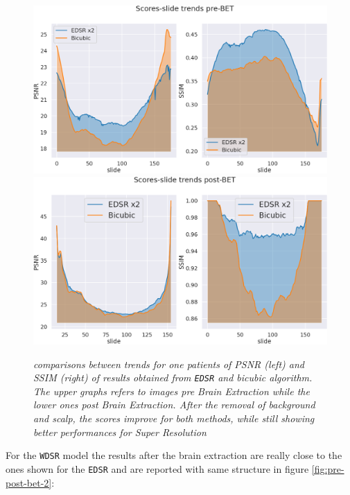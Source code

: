 \documentclass[12pt,a4paper]{report}
\begin{document}
\begin{figure}[H]
  \centering
  \includegraphics[scale=0.27]{./images/pre_bet_edsr.png}
  \includegraphics[scale=0.27]{./images/betted_x2_slide.png}
 \caption{\it comparisons between trends for one patients of PSNR (left) and SSIM (right) of results obtained from {\tt EDSR} and bicubic algorithm. The upper graphs refers to images pre Brain Extraction while the lower ones post Brain Extraction. After the removal of background and scalp, the scores improve for both methods, while still showing better performances for Super Resolution}
 \label{fig:pre-post-bet}
\end{figure}

For the {\tt WDSR} model the results after the brain extraction are really close to the ones shown for the {\tt EDSR} and are reported with same structure in figure \ref{fig:pre-post-bet-2}:
\end{document}
